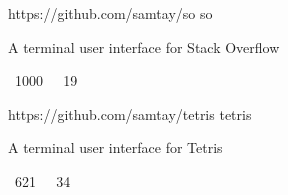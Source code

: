 \vspace{0.25em}
\begin{cvprojects}
  \cvproject
    {https://github.com/samtay/so}
    {so}
    {\begin{cvitems}
        \item A terminal user interface for Stack Overflow
        \item {\color{graytext} \faStarO \, 1000 $\;$ \faCodeFork \, 19}
     \end{cvitems}}
  \cvproject
    {https://github.com/samtay/tetris}
    {tetris}
    {\begin{cvitems}
        \item A terminal user interface for Tetris
        \item {\color{graytext} \faStarO \, 621 $\;$ \faCodeFork \, 34}
     \end{cvitems}}
\end{cvprojects}
